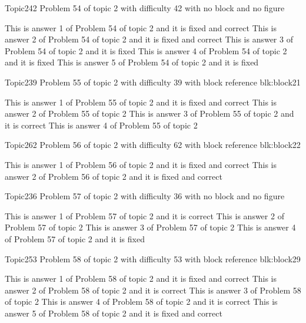 \documentclass[master]{exam}
\begin{document}
\begin{problem}{Topic2}{42}
	Problem 54 of topic 2 with difficulty 42 with no block and no figure
	\begin{answers}
		 This is answer 1 of Problem 54 of topic 2 and it is fixed and correct
		 This is answer 2 of Problem 54 of topic 2 and it is fixed and correct
		\answer[fixed] This is answer 3 of Problem 54 of topic 2 and it is fixed
		\answer[fixed] This is answer 4 of Problem 54 of topic 2 and it is fixed
		\answer[fixed] This is answer 5 of Problem 54 of topic 2 and it is fixed
	\end{answers}
\end{problem}

\begin{problem}[requires=blk:block21]{Topic2}{39}
	Problem 55 of topic 2 with difficulty 39 with block reference blk:block21
	\begin{answers}
		 This is answer 1 of Problem 55 of topic 2 and it is fixed and correct
		\answer This is answer 2 of Problem 55 of topic 2 
		\answer[correct] This is answer 3 of Problem 55 of topic 2 and it is correct
		\answer This is answer 4 of Problem 55 of topic 2 
	\end{answers}
\end{problem}

\begin{problem}[requires=blk:block22]{Topic2}{62}
	Problem 56 of topic 2 with difficulty 62 with block reference blk:block22
	\begin{answers}
		 This is answer 1 of Problem 56 of topic 2 and it is fixed and correct
		 This is answer 2 of Problem 56 of topic 2 and it is fixed and correct
	\end{answers}
\end{problem}

\begin{problem}{Topic2}{36}
	Problem 57 of topic 2 with difficulty 36 with no block and no figure
	\begin{answers}
		\answer[correct] This is answer 1 of Problem 57 of topic 2 and it is correct
		\answer This is answer 2 of Problem 57 of topic 2 
		\answer This is answer 3 of Problem 57 of topic 2 
		\answer[fixed] This is answer 4 of Problem 57 of topic 2 and it is fixed
	\end{answers}
\end{problem}

\begin{problem}[requires=blk:block29]{Topic2}{53}
	Problem 58 of topic 2 with difficulty 53 with block reference blk:block29
	\begin{answers}
		 This is answer 1 of Problem 58 of topic 2 and it is fixed and correct
		\answer[correct] This is answer 2 of Problem 58 of topic 2 and it is correct
		\answer This is answer 3 of Problem 58 of topic 2 
		\answer[correct] This is answer 4 of Problem 58 of topic 2 and it is correct
		 This is answer 5 of Problem 58 of topic 2 and it is fixed and correct
	\end{answers}
\end{problem}
\end{document}
